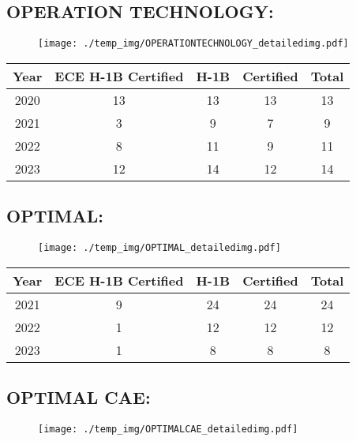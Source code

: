 \documentclass{article}%
\begin{document}
%
\newpage%
\subsection{OPERATION TECHNOLOGY:}%
\label{subsec:OPERATIONTECHNOLOGY}%
\label{OPERATIONTECHNOLOGYdetailed}%


\begin{figure}[htbp]%
\centering%
\texttt{[image: ./temp\_img/OPERATIONTECHNOLOGY\_detailedimg.pdf]}%
\end{figure}

%
\begin{longtable}{c|c|c|c|c}%
\hline%
Year&ECE H{-}1B Certified&H{-}1B&Certified&Total\\%
\hline%
2020&13&13&13&13\\%
\hline%
2021&3&9&7&9\\%
\hline%
2022&8&11&9&11\\%
\hline%
2023&12&14&12&14\\%
\hline%
\end{longtable}

%
\newpage%
\subsection{OPTIMAL:}%
\label{subsec:OPTIMAL}%
\label{OPTIMALdetailed}%


\begin{figure}[htbp]%
\centering%
\texttt{[image: ./temp\_img/OPTIMAL\_detailedimg.pdf]}%
\end{figure}

%
\begin{longtable}{c|c|c|c|c}%
\hline%
Year&ECE H{-}1B Certified&H{-}1B&Certified&Total\\%
\hline%
2021&9&24&24&24\\%
\hline%
2022&1&12&12&12\\%
\hline%
2023&1&8&8&8\\%
\hline%
\end{longtable}

%
\newpage%
\subsection{OPTIMAL CAE:}%
\label{subsec:OPTIMALCAE}%
\label{OPTIMALCAEdetailed}%


\begin{figure}[htbp]%
\centering%
\texttt{[image: ./temp\_img/OPTIMALCAE\_detailedimg.pdf]}%
\end{figure}
\end{document}
